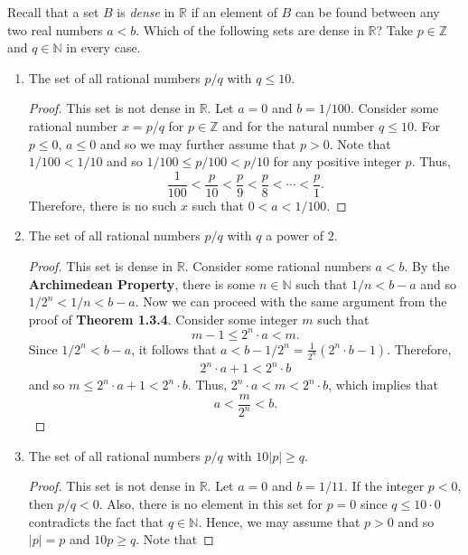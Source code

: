 \documentclass[12pt]{article}
\newcommand{\N}{\mathbb{N}}
\newcommand{\Z}{\mathbb{Z}}
\newcommand{\R}{\mathbb{R}}
\newenvironment{problem}[2][Problem]{\begin{trivlist}
		\item[\hskip \labelsep {\bfseries #1}\hskip \labelsep {\bfseries #2.}]}{\end{trivlist}}
\begin{document}
	\begin{problem}{1.4.6}
		Recall that a set $B$ is \textit{dense} in $\R$ if an element of $B$ can be found between any two real numbers $a<b$. Which of the following sets are dense in $\R$? Take $p\in \Z$ and $q\in \N$ in every case.
		\begin{enumerate}[label=(\alph*)]
			\item The set of all rational numbers $p/q$ with $q\leq 10$.
			\begin{proof}
				This set is not dense in $\R$. Let $a=0$ and $b=1/100$. Consider some rational number $x=p/q$ for $p\in \Z$ and for the natural number $q\leq 10$. For $p\leq 0$, $a \leq 0$ and so we may further assume that $p>0$.
				Note that $1/100 < 1/10$ and so $1/100 \leq  p/100 < p/10$ for any positive integer $p$. Thus,
				\begin{equation*}
					\frac{1}{100} < \frac{p}{10} < \frac{p}{9} < \frac{p}{8} < \cdots < \frac{p}{1}.
				\end{equation*}
				Therefore, there is no such $x$ such that $0<a<1/100$.
			\end{proof}
			\item The set of all rational numbers $p/q$ with $q$ a power of $2$.
			\begin{proof}
				This set is dense in $\R$. Consider some rational numbers $a<b$. By the \textbf{Archimedean Property}, there is some $n\in \N$ such that $1/n < b-a$ and so $1/2^{n} < 1/n < b-a$. Now we can proceed with the same argument from the proof of \textbf{Theorem 1.3.4}. Consider some integer $m$ such that 
				\begin{equation*}
					m-1 \leq 2^{n}\cdot a < m.
				\end{equation*}
				Since $1/2^{n} < b-a$, it follows that $a<b-1/2^{n} = \frac{1}{2^{n}} (2^{n} \cdot b-1)$. Therefore,
				\begin{align*}
					2^{n}\cdot a + 1< 2^{n}\cdot b 
				\end{align*}
				and so $m\leq 2^{n}\cdot a+1 < 2^{n}\cdot b$. Thus, $2^{n}\cdot a < m < 2^{n}\cdot b$, which implies that
				\begin{equation*}
					a < \frac{m}{2^{n}} < b. 
				\end{equation*}
			\end{proof}
			\item  The set of all rational numbers $p/q$ with $10|p|\geq q$.
			\begin{proof}
				This set is not dense in $\R$. Let $a = 0$ and $b = 1/11$. If the integer $p<0$, then $p/q < 0$. Also, there is no element in this set for $p=0$ since $q\leq 10\cdot 0$ contradicts the fact that $q\in \N$. Hence, we may assume that $p>0$ and so $|p| = p$ and $10p \geq q$. Note that

\end{proof}
\end{enumerate}
\end{problem}
\end{document}
